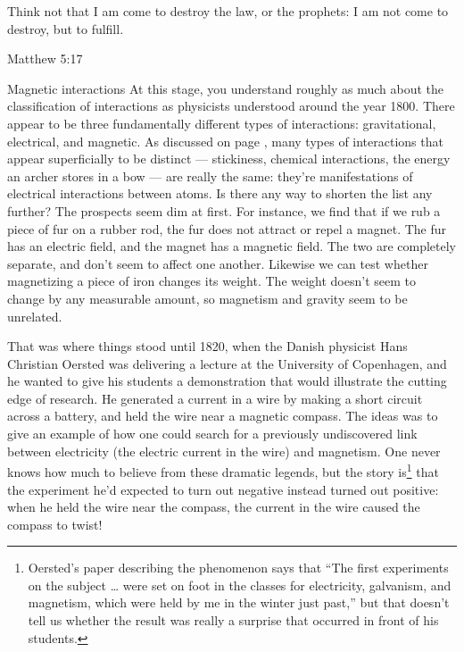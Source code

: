 	\epigraph{Think not that I am come to destroy the law, or the prophets:
	I am not come to destroy, but to fulfill.}{Matthew 5:17}
\begin{envsubsection}{Magnetic interactions}
At this stage, you understand roughly as much about the classification of interactions as physicists
understood around the year 1800. There appear to be three fundamentally different types
of interactions: gravitational, electrical, and magnetic. As discussed on
page \pageref{introunificationofforces}, many types of interactions that appear superficially to be
distinct --- stickiness, chemical interactions, the energy an archer stores in a bow --- are
really the same: they're manifestations of electrical interactions between atoms.
Is there any way to shorten the list any further? The prospects seem dim at first. For instance,
we find that if we rub a piece of fur on a rubber rod, the fur does not attract or repel a magnet.
The fur has an electric field, and the magnet has a magnetic field. The two are completely separate,
and don't seem to affect one another. Likewise we can test whether magnetizing a piece of iron
changes its weight. The weight doesn't seem to change by any measurable amount, so magnetism and
gravity seem to be unrelated.

That was where things stood until 1820, when the Danish physicist Hans Christian
Oersted was delivering a lecture at the University of Copenhagen, and he wanted to give his
students a demonstration that would illustrate the cutting edge of research. He generated
a current in a wire by making a short circuit across a battery, and held the wire near a
magnetic compass. The ideas was to give an example of how one could search for a previously undiscovered
link between electricity (the electric current in the wire) and magnetism. One never knows how much
to believe from these dramatic legends, but the story is\footnote{Oersted's paper
describing the phenomenon says that ``The first experiments on the subject \ldots
were set on foot in the classes for electricity, galvanism, and magnetism, which were
held by me in the winter just past,'' but that doesn't tell us whether the result was
really a surprise that occurred in front of his students.} that the experiment he'd expected to turn out
negative instead turned out positive: when he held the wire near the
compass, the current in the wire caused the compass to twist!


\end{envsubsection}
